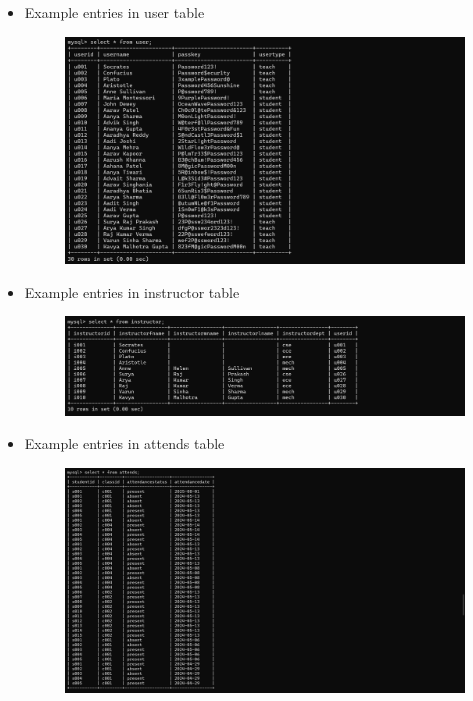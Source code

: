 \documentclass{article}
\begin{document}
\begin{itemize}
    \item \thispagestyle{empty}
    {\large{Example entries in user table}}
    \begin{figure}[H]
        \centering
        \includegraphics[width=1.1\textwidth, center]{4}
    \end{figure}

    \item \thispagestyle{empty}
    {\large{Example entries in instructor table}}
    \begin{figure}[H]
        \centering
        \includegraphics[width=1.1\textwidth, center]{5}
    \end{figure}

    \newpage

    \item \thispagestyle{empty}
    {\large{Example entries in attends table}}
    \begin{figure}[H]
        \centering
        \includegraphics[width=1.1\textwidth, center]{6}
    \end{figure}


\end{itemize}
\end{document}
